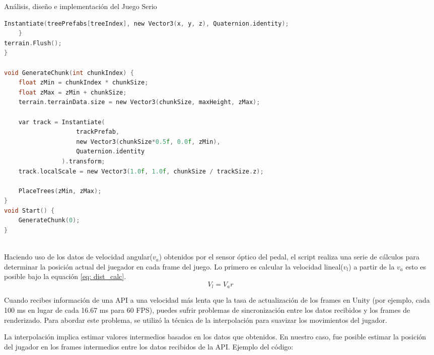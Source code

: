 \begin{thesischapter}{2} {Análisis, diseño e implementación del Juego Serio}
\begin{center}
\begin{minipage}{0.82\textwidth}
\begin{lstlisting}[language=c, label={hola}]
        Instantiate(treePrefabs[treeIndex], new Vector3(x, y, z), Quaternion.identity);
    }
terrain.Flush();
}

void GenerateChunk(int chunkIndex) {      
    float zMin = chunkIndex * chunkSize;
    float zMax = zMin + chunkSize;
    terrain.terrainData.size = new Vector3(chunkSize, maxHeight, zMax);

    var track = Instantiate(
                    trackPrefab, 
                    new Vector3(chunkSize*0.5f, 0.0f, zMin), 
                    Quaternion.identity
                ).transform;
    track.localScale = new Vector3(1.0f, 1.0f, chunkSize / trackSize.z);

    PlaceTrees(zMin, zMax);
}
void Start() {
    GenerateChunk(0);
}
                
\end{lstlisting}

\end{minipage}    
\end{center}

    \vspace{10pt}
    Haciendo uso de los datos de velocidad angular($v_{a}$) obtenidos por el sensor óptico del pedal, el script 
    realiza una serie de cálculos para determinar la posición actual del juegador en cada frame 
    del juego. Lo primero es calcular la velocidad lineal($v_{l}$) a partir de la $v_{a}$  esto es posible bajo la 
    equación \ref{eq: dist_calc}.
    \begin{equation}
        V_{l} = V_{a}r
        \label{eq: dist_calc}        
    \end{equation}

    \vspace{10pt}
    Cuando recibes información de una API a una velocidad más lenta que la tasa de actualización de los frames en Unity 
    (por ejemplo, cada 100 ms en lugar de cada 16.67 ms para 60 FPS), puedes sufrir problemas de sincronización entre los datos 
    recibidos y los frames de renderizado. Para abordar este problema, se utilizó la técnica de la interpolación para suavizar 
    los movimientos del jugador.

    \vspace{10pt}
    La interpolación implica estimar valores intermedios basados en los datos que obtenidos. En nuestro caso, fue posible estimar la 
    posición del jugador en los frames intermedios entre los datos recibidos de la API. Ejemplo del código:


\end{thesischapter}
